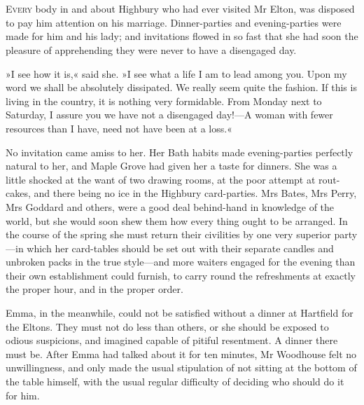 \chapter[Chapter \thechapter]{}
\lettrine[lines=4,lraise=0.3]{E}{very} body in and about Highbury who had ever visited Mr Elton, was disposed to pay him attention on his marriage. Dinner-parties and evening-parties were made for him and his lady; and invitations flowed in so fast that she had soon the pleasure of apprehending they were never to have a disengaged day.

»I see how it is,« said she. »I see what a life I am to lead among you. Upon my word we shall be absolutely dissipated. We really seem quite the fashion. If this is living in the country, it is nothing very formidable. From Monday next to Saturday, I assure you we have not a disengaged day!—A woman with fewer resources than I have, need not have been at a loss.«

No invitation came amiss to her. Her Bath habits made evening-parties perfectly natural to her, and Maple Grove had given her a taste for dinners. She was a little shocked at the want of two drawing rooms, at the poor attempt at rout-cakes, and there being no ice in the Highbury card-parties. Mrs Bates, Mrs Perry, Mrs Goddard and others, were a good deal behind-hand in knowledge of the world, but she would soon shew them how every thing ought to be arranged. In the course of the spring she must return their civilities by one very superior party—in which her card-tables should be set out with their separate candles and unbroken packs in the true style—and more waiters engaged for the evening than their own establishment could furnish, to carry round the refreshments at exactly the proper hour, and in the proper order.

Emma, in the meanwhile, could not be satisfied without a dinner at Hartfield for the Eltons. They must not do less than others, or she should be exposed to odious suspicions, and imagined capable of pitiful resentment. A dinner there must be. After Emma had talked about it for ten minutes, Mr Woodhouse felt no unwillingness, and only made the usual stipulation of not sitting at the bottom of the table himself, with the usual regular difficulty of deciding who should do it for him.

